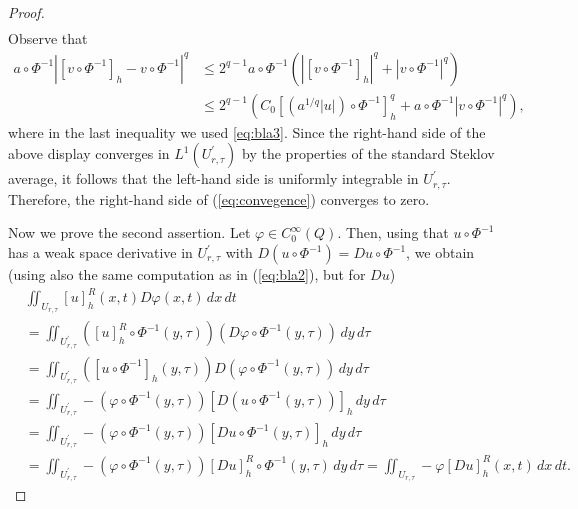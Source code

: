\documentclass[notitlepage,11pt,reqno]{amsart}
\theoremstyle{definition}
\numberwithin{equation}{section}
\begin{document}
\begin{proof}
\begin{align}
\end{align}
Observe that 
\begin{align*}
a\circ\Phi^{-1}\left|[v\circ\Phi^{-1}]_{h}-v\circ\Phi^{-1}\right|^{q}&\leq2^{q-1}a\circ\Phi^{-1}\left(\left|[v\circ\Phi^{-1}]_{h}\right|^{q}+\left|v\circ\Phi^{-1}\right|^{q}\right) \\&\leq2^{q-1}\left(C_0 [(a^{1/q}|u|)\circ\Phi^{-1}]_h^q +a\circ\Phi^{-1}|v\circ\Phi^{-1}|^q \right),
\end{align*}
where in the last inequality we used \eqref{eq:bla3}. Since the right-hand side of the above display converges in $L^{1}(U^{\prime}_{r, \tau})$ by the properties of the standard Steklov average, it follows that the left-hand side
is uniformly integrable in $U^{\prime}_{r, \tau}$. Therefore, the right-hand
side of (\ref{eq:convegence}) converges to zero.

Now we prove the second assertion. Let $\varphi\in C_{0}^{\infty}(Q)$. Then, using that
$u\circ\Phi^{-1}$ has a weak space derivative in $U^{\prime}_{r, \tau}$ with
$D(u\circ\Phi^{-1})=Du\circ\Phi^{-1}$, we obtain (using also the
same computation as in (\ref{eq:bla2}), but for $Du$)
\begin{align*}
&\iint_{U_{r, \tau}}[u]_{h}^{R}(x, t)D\varphi(x,t)\,dx\,dt\\
& =\iint_{U^{\prime}_{r, \tau}}([u]_{h}^{R}\circ\Phi^{-1}(y, \tau))(D\varphi\circ\Phi^{-1}(y, \tau))\,dy\, d\tau\\
 & =\iint_{U^{\prime}_{r, \tau}}([u\circ\Phi^{-1}]_{h}(y, \tau))D(\varphi\circ\Phi^{-1}(y, \tau))\,dy\, d\tau\\
 & =\iint_{U^{\prime}_{r, \tau}}-(\varphi\circ\Phi^{-1}(y, \tau))[D(u\circ\Phi^{-1}(y, \tau))]_{h}\,dy\, d\tau\\
 & =\iint_{U^{\prime}_{r, \tau}}-(\varphi\circ\Phi^{-1}(y, \tau))[Du\circ\Phi^{-1}(y, \tau)]_{h}\,dy\, d\tau\\
 & =\iint_{U^{\prime}_{r, \tau}}-(\varphi\circ\Phi^{-1}(y, \tau))[Du]_{h}^{R}\circ\Phi^{-1}(y, \tau)\,dy\, d\tau=\iint_{U_{r, \tau}}-\varphi[Du]_{h}^{R}(x, t)\,dx\,dt.
\end{align*}


\end{proof}
\end{document}
